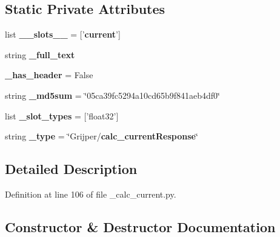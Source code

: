 \subsection*{Static Private Attributes}
\begin{DoxyCompactItemize}
\item 
list {\bf \-\_\-\-\_\-slots\-\_\-\-\_\-} = ['{\bf current}']
\item 
string {\bf \-\_\-full\-\_\-text}
\item 
{\bf \-\_\-has\-\_\-header} = False
\item 
string {\bf \-\_\-md5sum} = \char`\"{}05ca39fc5294a10cd65b9f841aeb4df0\char`\"{}
\item 
list {\bf \-\_\-slot\-\_\-types} = ['float32']
\item 
string {\bf \-\_\-type} = \char`\"{}Grijper/{\bf calc\-\_\-current\-Response}\char`\"{}
\end{DoxyCompactItemize}


\subsection{Detailed Description}


Definition at line 106 of file \-\_\-calc\-\_\-current.\-py.



\subsection{Constructor \& Destructor Documentation}
